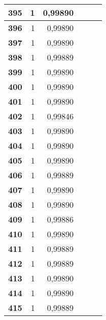 {\begin{longtable}{|r|r|r|l|r|r|}
\textbf{395} & 1 & 0,99890 &  & \multicolumn{1}{l|}{} & \multicolumn{1}{l|}{} \\ \hline
\textbf{396} & 1 & 0,99890 &  & \multicolumn{1}{l|}{} & \multicolumn{1}{l|}{} \\ \hline
\textbf{397} & 1 & 0,99890 &  & \multicolumn{1}{l|}{} & \multicolumn{1}{l|}{} \\ \hline
\textbf{398} & 1 & 0,99889 &  & \multicolumn{1}{l|}{} & \multicolumn{1}{l|}{} \\ \hline
\textbf{399} & 1 & 0,99890 &  & \multicolumn{1}{l|}{} & \multicolumn{1}{l|}{} \\ \hline
\textbf{400} & 1 & 0,99890 &  & \multicolumn{1}{l|}{} & \multicolumn{1}{l|}{} \\ \hline
\textbf{401} & 1 & 0,99890 &  & \multicolumn{1}{l|}{} & \multicolumn{1}{l|}{} \\ \hline
\textbf{402} & 1 & 0,99846 &  & \multicolumn{1}{l|}{} & \multicolumn{1}{l|}{} \\ \hline
\textbf{403} & 1 & 0,99890 &  & \multicolumn{1}{l|}{} & \multicolumn{1}{l|}{} \\ \hline
\textbf{404} & 1 & 0,99890 &  & \multicolumn{1}{l|}{} & \multicolumn{1}{l|}{} \\ \hline
\textbf{405} & 1 & 0,99890 &  & \multicolumn{1}{l|}{} & \multicolumn{1}{l|}{} \\ \hline
\textbf{406} & 1 & 0,99889 &  & \multicolumn{1}{l|}{} & \multicolumn{1}{l|}{} \\ \hline
\textbf{407} & 1 & 0,99890 &  & \multicolumn{1}{l|}{} & \multicolumn{1}{l|}{} \\ \hline
\textbf{408} & 1 & 0,99890 &  & \multicolumn{1}{l|}{} & \multicolumn{1}{l|}{} \\ \hline
\textbf{409} & 1 & 0,99886 &  & \multicolumn{1}{l|}{} & \multicolumn{1}{l|}{} \\ \hline
\textbf{410} & 1 & 0,99890 &  & \multicolumn{1}{l|}{} & \multicolumn{1}{l|}{} \\ \hline
\textbf{411} & 1 & 0,99889 &  & \multicolumn{1}{l|}{} & \multicolumn{1}{l|}{} \\ \hline
\textbf{412} & 1 & 0,99889 &  & \multicolumn{1}{l|}{} & \multicolumn{1}{l|}{} \\ \hline
\textbf{413} & 1 & 0,99890 &  & \multicolumn{1}{l|}{} & \multicolumn{1}{l|}{} \\ \hline
\textbf{414} & 1 & 0,99890 &  & \multicolumn{1}{l|}{} & \multicolumn{1}{l|}{} \\ \hline
\textbf{415} & 1 & 0,99889 &  & \multicolumn{1}{l|}{} & \multicolumn{1}{l|}{} \\ \hline

\end{longtable}}
